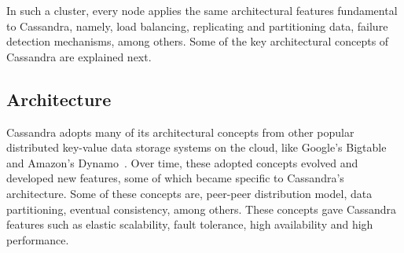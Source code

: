 In such a cluster,  every node applies the same architectural features
fundamental to Cassandra,  namely,  load balancing,  replicating
and partitioning data,  failure detection mechanisms, among others.  Some of the
key architectural concepts of Cassandra are explained next. 




\subsection{Architecture} \label{ss:Background-Cassandra-Archi}
Cassandra adopts many of its  architectural concepts from other popular
distributed key-value data storage systems on the cloud,  like Google's Bigtable
and Amazon's Dynamo~\citep{ycsb,Dynamo}.  Over time, these adopted concepts
evolved and developed new features,  some of which became specific to Cassandra's
architecture. Some of these  concepts are, peer-peer distribution model, data
partitioning, eventual consistency, among others. These  concepts gave Cassandra
  features such as elastic scalability,  fault tolerance, high availability and
high performance.



